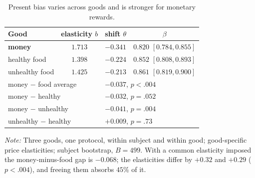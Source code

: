 \documentclass[11pt,a4paper]{article}
\theoremstyle{plain}
\theoremstyle{definition}
\begin{document}
\begin{table}[H]\centering
\caption{Present bias varies across goods and is stronger for monetary rewards.}
\label{tab:goods}
\begin{threeparttable}
{\footnotesize
\renewcommand{\arraystretch}{1.12}%
\setlength{\tabcolsep}{27pt}%
\begin{tabular}{lccc}
\toprule
Good & elasticity $b$ & shift $\theta$ & $\beta$ \\
\midrule
\textbf{money} & $1.713$ & $-0.341$ & $\mathbf{0.820}$ $[0.784,0.855]$ \\
healthy food & $1.398$ & $-0.224$ & $0.852$ $[0.808,0.893]$ \\
unhealthy food & $1.425$ & $-0.213$ & $0.861$ $[0.819,0.900]$ \\
\midrule
\multicolumn{2}{l}{money $-$ food average} & \multicolumn{2}{l}{$\mathbf{-0.037}$, $p<.004$} \\%
\multicolumn{2}{l}{money $-$ healthy} & \multicolumn{2}{l}{$-0.032$, $p=.052$} \\
\multicolumn{2}{l}{money $-$ unhealthy} & \multicolumn{2}{l}{$-0.041$, $p=.004$} \\
\multicolumn{2}{l}{unhealthy $-$ healthy} & \multicolumn{2}{l}{$+0.009$, $p=.73$} \\
\bottomrule
\end{tabular}}
\begin{tablenotes}[flushleft]
\footnotesize
\item \textit{Note:} 
Three goods, one protocol, within subject and within good; good-specific price
elasticities; subject bootstrap, $B=499$. With a common elasticity imposed the money-minus-food
gap is $-0.068$; the elasticities differ by $+0.32$ and $+0.29$ ($p<.004$), and freeing
them absorbs $45\%$ of it.
\end{tablenotes}
\end{threeparttable}
\end{table}
\end{document}
